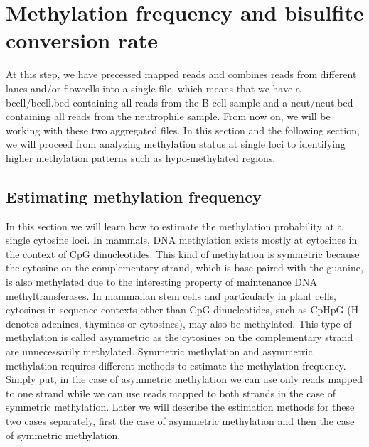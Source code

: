 \documentclass{article}
\begin{document}
\section{Methylation frequency and bisulfite conversion rate}
\label{sec:estim-methyl-freq}
At this step, we have precessed mapped reads and combines reads from
different lanes and/or flowcells into a single file, which means that
we have a bcell/bcell.bed containing all reads from the B cell sample
and a neut/neut.bed containing all reads from the neutrophile
sample. From now on, we will be working with these two aggregated
files. In this section and the following section, we will proceed from
analyzing methylation status at single loci to identifying higher
methylation patterns such as hypo-methylated regions. 

\subsection{Estimating methylation frequency}
\label{sec:estim-methyl-freq}
In this section we will learn how to estimate the methylation
probability at a single cytosine loci. In mammals, DNA methylation
exists mostly at cytosines in the context of CpG dinucleotides. This
kind of methylation is symmetric because the cytosine on the
complementary strand, which is base-paired with the guanine, is also
methylated due to the interesting property of maintenance DNA
methyltransferases. In mammalian stem cells and particularly in plant
cells, cytosines in sequence contexts other than CpG dinucleotides,
such as CpHpG (H denotes adenines, thymines or cytosines), may also be
methylated. This type of methylation is called asymmetric as the
cytosines on the complementary strand are unnecessarily
methylated. Symmetric methylation and asymmetric methylation requires
different methods to estimate the methylation frequency. Simply put,
in the case of asymmetric methylation we can use only reads mapped to
one strand while we can use reads mapped to both strands in the case
of symmetric methylation. Later we will describe the estimation
methods for these two cases separately, first the case of asymmetric
methylation and then the case of symmetric methylation. 
\end{document}
